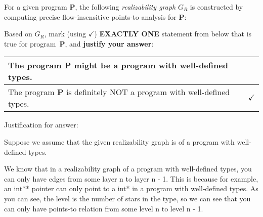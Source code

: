 \documentclass[12pt]{article}
\begin{document}
\begin{enumerate}
      For a given program \textbf{P}, the following \emph{realizability graph}
      $G_R$ is constructed by computing precise flow-insensitive points-to
      analysis for \textbf{P}:
      \vspace{-2ex}
      \begin{center}
      \end{center}
      \vspace{-1ex}
        Based on $G_R$, mark (using $\checkmark$) \textbf{EXACTLY ONE} statement
        from below that is true for program~\textbf{P}, and \textbf{justify your
        answer}:
        \vspace{-2ex}
        \renewcommand{\arraystretch}{1.5}
        \begin{center}
        \begin{tabular}{|l|l|}
          \hline
          The program \textbf{P} might be a program with well-defined types. & \hspace{3em} \\ \hline
          The program \textbf{P} is definitely NOT a program with well-defined types. & $\checkmark$ \\ \hline 
        \end{tabular}
      \end{center}
      \vspace{-2ex}
       \begin{mdframed}
        Justification for answer:

        Suppose we assume that the given realizability graph is of a program with well-defined types.

        We know that in a realizability graph of a program with well-defined types, you can only have edges from some layer n to layer n - 1. This is because for example, an int** pointer can only point to a int* in a program with well-defined types. As you can see, the level is the number of stars in the type, so we can see that you can only have points-to relation from some level n to level n - 1.


\end{mdframed}
\end{enumerate}
\end{document}
